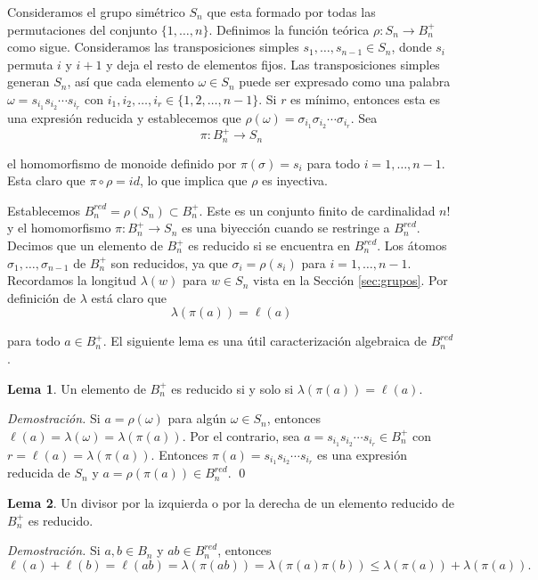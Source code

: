 \documentclass[12pt]{article}
\theoremstyle{definition}
\newtheorem{lema}{Lema}[section]
\begin{document}
Consideramos el grupo simétrico $S_n$ que esta formado por todas las permutaciones del conjunto $\{1,\ldots,n\}$. Definimos la función teórica $\rho:S_n\rightarrow B_n^+$ como sigue. Consideramos las transposiciones simples $s_1,\ldots,s_{n-1}\in S_n$, donde $s_i$ permuta $i$ y $i+1$ y deja el resto de elementos fijos. Las transposiciones simples generan $S_n$, así que cada elemento $\omega\in S_n$ puede ser expresado como una palabra $\omega = s_{i_1}s_{i_2}\cdots s_{i_r}$ con $i_1,i_2,\ldots,i_r\in\{1,2,\ldots,n-1\}$. Si $r$ es mínimo, entonces esta es una expresión reducida y establecemos que $\rho(\omega)=\sigma_{i_1}\sigma_{i_2}\cdots \sigma_{i_r}$. Sea
$$\pi:B_n^+\rightarrow S_n$$

el homomorfismo de monoide definido por $\pi(\sigma)=s_i$ para todo $i=1,\ldots,n-1$. Esta claro que $\pi\circ\rho = id$, lo que implica que $\rho$ es inyectiva.

Establecemos $B_n^{red}=\rho(S_n)\subset B_n^+$. Este es un conjunto finito de cardinalidad $n!$ y el homomorfismo $\pi:B_n^+\rightarrow S_n$ es una biyección cuando se restringe a $B_n^{red}$. Decimos que un elemento de $B_n^+$ es reducido si se encuentra en $B_n^{red}$. Los átomos $\sigma_1,\ldots,\sigma_{n-1}$ de $B_n^+$ son reducidos, ya que $\sigma_i=\rho(s_i)$ para $i=1,\ldots,n-1$. Recordamos la longitud $\lambda(w)$ para $w\in S_n$ vista en la Sección \ref{sec:grupos}. Por definición de $\lambda$ está claro que
$$\lambda(\pi(a))=\ell(a)$$

para todo $a\in B_n^+$. El siguiente lema es una útil caracterización algebraica de $B_n^{red}$.

\begin{lema}
Un elemento de $B_n^+$ es reducido si y solo si $\lambda(\pi(a))=\ell(a)$.
\label{lema:reduced1}
\end{lema}

\textit{Demostración.} Si $a=\rho(\omega)$ para algún $\omega\in S_n$, entonces $\ell(a)=\lambda(\omega)=\lambda(\pi(a))$. Por el contrario, sea $a=s_{i_1}s_{i_2}\cdots s_{i_r}\in B_n^+$ con $r=\ell(a)=\lambda(\pi(a))$. Entonces $\pi(a)=s_{i_1}s_{i_2}\cdots s_{i_r}$ es una expresión reducida de $S_n$ y $a=\rho(\pi(a))\in B_n^{red}$. \qed

\begin{lema}
Un divisor por la izquierda o por la derecha de un elemento reducido de $B_n^+$ es reducido.
\label{lema:reduced2}
\end{lema}

\textit{Demostración.} Si $a,b\in B_n$ y $ab\in B_n^{red}$, entonces
$$\ell(a) + \ell(b)= \ell(ab)=\lambda(\pi(ab))=\lambda(\pi(a)\pi(b))\leq \lambda(\pi(a))+\lambda(\pi(a)).$$
\end{document}

